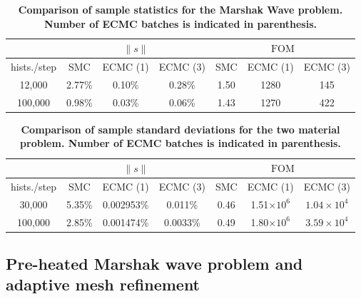 \documentclass[12pt]{article}
\renewcommand{\ss}{\ensuremath{\|s\|}}
\newcommand{\FOM}{\ensuremath{\text{FOM}}}
\begin{document}
\begin{center}
\begin{table}[H]
\centering
\caption{\label{homarshak_var} \textbf{Comparison of sample statistics for the Marshak Wave problem.  Number of ECMC batches is
indicated in parenthesis.}}
\vspace{-0.1in}
\begin{tabular}{|c|ccc|ccc|}\cline{2-7}
    \multicolumn{1}{c|}{}       & \multicolumn{3}{|c|}{\ss} &     \multicolumn{3}{|c|}{\FOM} \\ \hline
hists./step   & SMC & ECMC (1) & ECMC (3)  & SMC & ECMC (1) & ECMC (3)   \\ \hline
   12,000	   & 2.77\%  & 0.10\% &  0.28\% &   1.50    & 1280  & 145     \\
  100,000      & 0.98\%  & 0.03\% &  0.06\% &   1.43    & 1270  & 422     \\ \hline
\end{tabular}
\end{table}


\begin{table}[H]
\centering
\caption{\label{hotwomat_var} \textbf{Comparison of sample standard deviations for the
    two material problem. Number of ECMC batches is indicated in parenthesis.}}
\vspace{-0.1in}
\begin{tabular}{|c|ccc|ccc|}\cline{2-7}
    \multicolumn{1}{c|}{}       & \multicolumn{3}{|c|}{\ss} &
    \multicolumn{3}{|c|}{\FOM} \\ \hline
hists./step   & SMC & ECMC (1) & ECMC (3)  & SMC & ECMC (1) & ECMC
(3)   \\ \hline
   30,000	  & 5.35\%   & 0.002953\% & 0.011\%  & 0.46     & 1.51$\times10^6$   & $1.04\times10^4$          \\
  100,000     & 2.85\%   & 0.001474\% & 0.0033\% & 0.49     & 1.80$\times10^6$   & $3.59\times10^4$          \\ \hline
\end{tabular}
\end{table}

\subsection{Pre-heated Marshak wave problem and adaptive mesh refinement}


\end{center}
\end{document}
